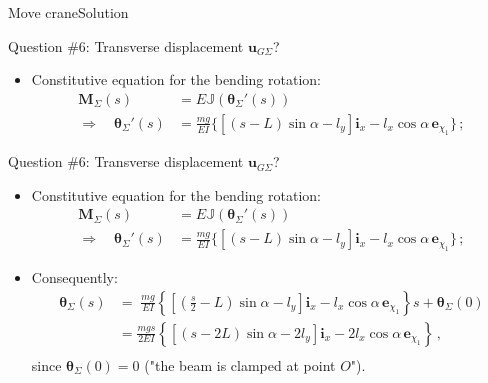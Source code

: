 \documentclass{beamer}
\newcommand{\imply}{\Rightarrow}
\newcommand{\uj}{u}
\newcommand{\xj}{x}
\newcommand{\yj}{y}
\newcommand{\uv}{{\boldsymbol\uj}}
\newcommand{\ej}{e}
\renewcommand{\ij}{i}
\newcommand{\ev}{{\boldsymbol\ej}}
\newcommand{\iv}{{\boldsymbol\ij}}
\newcommand*{\xiu}{\chi_1}
\newcommand*{\drotj}{\theta}
\newcommand*{\drot}{{\boldsymbol\drotj}}
\newcommand*{\Mstaticj}{J}
\newcommand*{\Mstatic}{{\mathbb\Mstaticj}}
\newcommand{\Mresj}{M}
\newcommand{\Mres}{{\boldsymbol\Mresj}}
\begin{document}
\begin{frame}{Move crane}{Solution}

\begin{overprint}

\vskip-20pt
\begin{exampleblock}{Question \#6: Transverse displacement $\uv_{G\Sigma}$?}
\begin{itemize}
\item Constitutive equation for the bending rotation:
\begin{displaymath}
\begin{split}
\Mres_\Sigma(s) &=E\Mstatic(\drot_\Sigma'(s)) \\
\imply\quad \drot_\Sigma'(s) &=\frac{mg}{EI}\{[(s-L)\sin\alpha-l_\yj]\iv_\xj-l_\xj\cos\alpha\,\ev_{\xiu}\}\,;
\end{split}
\end{displaymath}
\end{itemize}
\end{exampleblock}

\vskip-20pt
\begin{exampleblock}{Question \#6: Transverse displacement $\uv_{G\Sigma}$?}
\begin{itemize}
\item Constitutive equation for the bending rotation:
\begin{displaymath}
\begin{split}
\Mres_\Sigma(s) &=E\Mstatic(\drot_\Sigma'(s)) \\
\imply\quad \drot_\Sigma'(s) &=\frac{mg}{EI}\{[(s-L)\sin\alpha-l_\yj]\iv_\xj-l_\xj\cos\alpha\,\ev_{\xiu}\}\,;
\end{split}
\end{displaymath}
\item Consequently:
\begin{displaymath}
\begin{split}
\drot_\Sigma(s) &= \;\scriptstyle\frac{mg}{EI}\left\{\left[\left(\frac{s}{2}-L\right)\sin\alpha-l_\yj\right]\iv_\xj-l_\xj\cos\alpha\,\ev_{\xiu}\right\}s+\drot_\Sigma(0) \\
&=\frac{mgs}{2EI}\left\{\left[\left(s-2L\right)\sin\alpha-2l_\yj\right]\iv_\xj-2l_\xj\cos\alpha\,\ev_{\xiu}\right\}\,, \\
\end{split}
\end{displaymath}
since $\drot_\Sigma(0)=0$ ("the beam is clamped at point $O$").
\end{itemize}
\end{exampleblock}



\end{overprint}
\end{frame}
\end{document}
